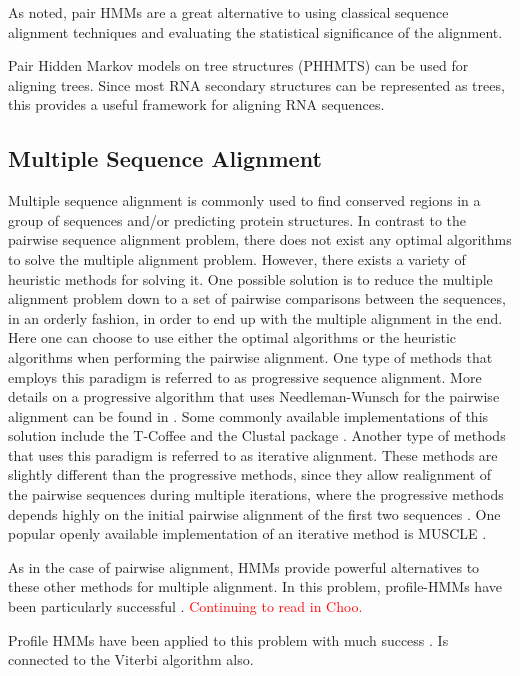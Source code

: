 \documentclass{article}
\begin{document}
As noted, pair HMMs are a great alternative to using classical sequence alignment techniques and evaluating the statistical significance of the alignment. 

Pair Hidden Markov models on tree structures (PHHMTS) can be used for aligning trees. Since most RNA secondary structures can be represented as trees, this provides a useful framework for aligning RNA sequences. 

\subsection{Multiple Sequence Alignment}
Multiple sequence alignment is commonly used to find conserved regions in a group of sequences and/or predicting protein structures. In contrast to the pairwise sequence alignment problem, there does not exist any optimal algorithms to solve the multiple alignment problem. However, there exists a variety of heuristic methods for solving it. One possible solution is to reduce the multiple alignment problem down to a set of pairwise comparisons between the sequences, in an orderly fashion, in order to end up with the multiple alignment in the end. Here one can choose to use either the optimal algorithms or the heuristic algorithms when performing the pairwise alignment. One type of methods that employs this paradigm is referred to as progressive sequence alignment. More details on a progressive algorithm that uses Needleman-Wunsch for the pairwise alignment can be found in \cite{Feng1987}. Some commonly available implementations of this solution include the T-Coffee and the Clustal package \cite{EMBL-EBI-Multiple}. Another type of methods that uses this paradigm is referred to as iterative alignment. These methods are slightly different than the progressive methods, since they allow realignment of the pairwise sequences during multiple iterations, where the progressive methods depends highly on the initial pairwise alignment of the first two sequences \cite{BioInfoOrgMSA}. One popular openly available implementation of an iterative method is MUSCLE \cite{EMBL-EBI-Multiple}. 

As in the case of pairwise alignment, HMMs provide powerful alternatives to these other methods for multiple alignment. In this problem, profile-HMMs have been particularly successful \cite{Choo2004}. \textcolor{red}{Continuing to read in Choo.}

Profile HMMs have been applied to this problem with much success . Is connected to the Viterbi algorithm also.   
\end{document}
